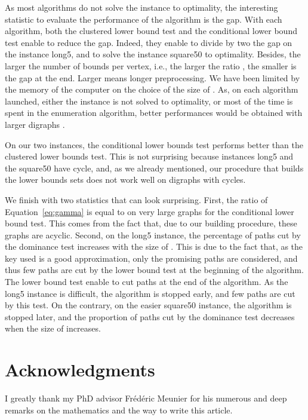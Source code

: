\documentclass[11pt]{amsart}
\theoremstyle{plain}
\theoremstyle{remark}
\begin{document}
As most algorithms do not solve the instance to optimality, the interesting statistic to evaluate the performance of the algorithm is the gap. With each algorithm, both the clustered lower bound test and the conditional lower bound test enable to reduce the gap. Indeed, they enable to divide by two the gap on the instance long5, and to solve the instance square50 to optimality. Besides, the larger the number of bounds per vertex, i.e., the larger the ratio , the smaller is the gap at the end. Larger  means longer preprocessing. We have been limited by the memory of the computer on the choice of the size of . As, on each algorithm launched, either the instance is not solved to optimality, or most of the time is spent in the enumeration algorithm, better performances  would be obtained with larger digraphs .

On our two instances, the conditional lower bounds test performs better than the clustered lower bounds test. This is not surprising because instances long5 and the square50 have cycle, and, as we already mentioned, our procedure that builds the lower bounds sets  does not work well on digraphs with cycles. 

We finish with two statistics that can look surprising. First, the ratio  of Equation~\eqref{eq:gamma} is equal to  on very large graphs  for the conditional lower bound test. This comes from the fact that, due to our building procedure, these graphs are acyclic. Second, on the long5 instance, the percentage of paths cut by the dominance test increases with the size of . This is due to the fact that, as the key used is a good approximation, only the promising paths are considered, and thus few paths are cut by the lower bound test at the beginning of the algorithm. The lower bound test enable to cut paths at the end of the algorithm. As the long5 instance is difficult, the algorithm is stopped early, and few paths are cut by this test. On the contrary, on the easier square50 instance, the algorithm is stopped later, and the proportion of paths cut by the dominance test decreases when the size of  increases.
















\section*{Acknowledgments}
I greatly thank my PhD advisor Fr\'ed\'eric Meunier for his numerous and deep remarks on the mathematics and the way to write this article. 





\end{document}
